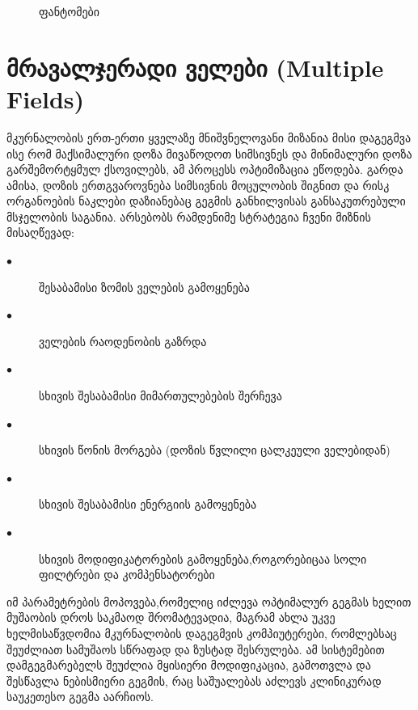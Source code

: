 \documentclass[12pt,a4paper,]{report}
\begin{document}
	\begin{figure}[h]%
    	\centering
    	\qquad
    	\caption{ფანტომები}%
    	\label{fig:phantom}%
	\end{figure}

\section{მრავალჯერადი ველები (Multiple Fields)}
მკურნალობის ერთ-ერთი ყველაზე მნიშვნელოვანი მიზანია მისი დაგეგმვა ისე რომ მაქსიმალური დოზა მივაწოდოთ სიმსივნეს და მინიმალური დოზა გარშემორტყმულ ქსოვილებს, ამ პროცესს ოპტიმიზაცია ეწოდება. გარდა ამისა, დოზის ერთგვაროვნება სიმსივნის მოცულობის შიგნით და რისკ ორგანოების ნაკლები დაზიანებაც გეგმის განხილვისას განსაკუთრებული მსჯელობის საგანია. 
არსებობს რამდენიმე სტრატეგია ჩვენი მიზნის მისაღწევად:
	\begin{description}
      \item[$\bullet$] შესაბამისი ზომის ველების გამოყენება
      \item[$\bullet$] ველების რაოდენობის გაზრდა
      \item[$\bullet$] სხივის შესაბამისი მიმართულებების შერჩევა
      \item[$\bullet$] სხივის წონის მორგება (დოზის წვლილი ცალკეული ველებიდან)
      \item[$\bullet$] სხივის შესაბამისი ენერგიის გამოყენება
      \item[$\bullet$] სხივის მოდიფიკატორების გამოყენება,როგორებიცაა სოლი ფილტრები და კომპენსატორები
    \end{description}
იმ პარამეტრების მოპოვება,რომელიც იძლევა ოპტიმალურ გეგმას ხელით მუშაობის დროს საკმაოდ შრომატევადია, მაგრამ ახლა უკვე ხელმისაწვდომია მკურნალობის დაგეგმვის კომპიუტერები, რომლებსაც შეუძლიათ სამუშაოს სწრაფად და ზუსტად შესრულება. ამ სისტემებით დამგეგმარებელს შეუძლია მყისიერი მოდიფიკაცია, გამოთვლა და შესწავლა ნებისმიერი გეგმის, რაც საშუალებას აძლევს კლინიკურად საუკეთესო გეგმა აარჩიოს.
\end{document}

